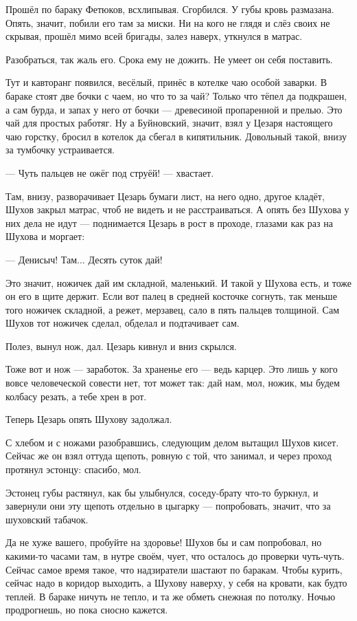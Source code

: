 Прошёл по бараку Фетюков, всхлипывая. Сгорбился. У губы кровь размазана. Опять, значит,
побили его там за миски. Ни на кого не глядя и слёз своих не скрывая, прошёл мимо всей бригады,
залез наверх, уткнулся в матрас.

Разобраться, так жаль его. Срока ему не дожить. Не умеет он себя поставить.

Тут и кавторанг появился, весёлый, принёс в котелке чаю особой заварки. В бараке стоят две
бочки с чаем, но что то за чай? Только что тёпел да подкрашен, а сам бурда, и запах у него от
бочки --- древесиной пропаренной и прелью. Это чай для простых работяг. Ну а Буйновский,
значит, взял у Цезаря настоящего чаю горстку, бросил в котелок да сбегал в кипятильник.
Довольный такой, внизу за тумбочку устраивается.

--- Чуть пальцев не ожёг под струёй! --- хвастает.

Там, внизу, разворачивает Цезарь бумаги лист, на него одно, другое кладёт, Шухов закрыл
матрас, чтоб не видеть и не расстраиваться. А опять без Шухова у них дела не идут ---
поднимается Цезарь в рост в проходе, глазами как раз на Шухова и моргает:

--- Денисыч! Там... Десять суток дай!

Это значит, ножичек дай им складной, маленький. И такой у Шухова есть, и тоже он его в щите
держит. Если вот палец в средней косточке согнуть, так меньше того ножичек складной, а режет,
мерзавец, сало в пять пальцев толщиной. Сам Шухов тот ножичек сделал, обделал и подтачивает
сам.

Полез, вынул нож, дал. Цезарь кивнул и вниз скрылся.

Тоже вот и нож --- заработок. За храненье его --- ведь карцер. Это лишь у кого вовсе человеческой
совести нет, тот может так: дай нам, мол, ножик, мы будем колбасу резать, а тебе хрен в рот.

Теперь Цезарь опять Шухову задолжал.

С хлебом и с ножами разобравшись, следующим делом вытащил Шухов кисет. Сейчас же он взял
оттуда щепоть, ровную с той, что занимал, и через проход протянул эстонцу: спасибо, мол.

Эстонец губы растянул, как бы улыбнулся, соседу-брату что-то буркнул, и завернули они эту
щепоть отдельно в цыгарку --- попробовать, значит, что за шуховский табачок.

Да не хуже вашего, пробуйте на здоровье! Шухов бы и сам попробовал, но какими-то часами там, в
нутре своём, чует, что осталось до проверки чуть-чуть. Сейчас самое время такое, что
надзиратели шастают по баракам. Чтобы курить, сейчас надо в коридор выходить, а Шухову
наверху, у себя на кровати, как будто теплей. В бараке ничуть не тепло, и та же обметь снежная
по потолку. Ночью продрогнешь, но пока сносно кажется.

